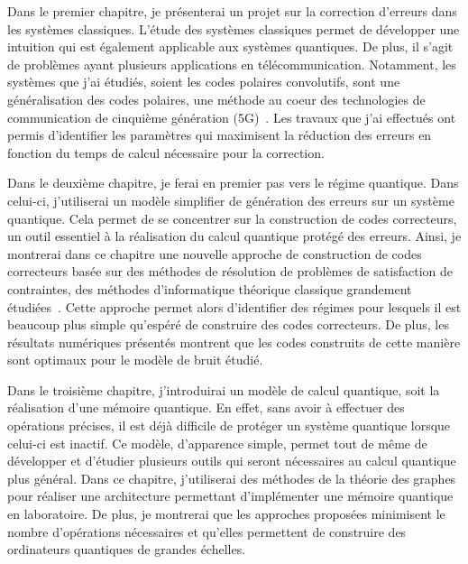 Dans le premier chapitre,
je présenterai un projet sur la correction d'erreurs dans les systèmes classiques.
L'étude des systèmes classiques permet de développer une intuition qui est également
applicable aux systèmes quantiques.
De plus, il s'agit de problèmes ayant plusieurs applications en télécommunication.
Notamment,
les systèmes que j'ai étudiés,
soient les codes polaires convolutifs,
sont une généralisation des codes polaires,
une méthode au coeur des technologies de communication de cinquième génération (5G)~\cite{arikan_rate_2009, bioglio_design_2021}.
Les travaux que j'ai effectués ont permis d'identifier les paramètres qui maximisent la réduction des erreurs
en fonction du temps de calcul nécessaire pour la correction.

Dans le deuxième chapitre,
je ferai en premier pas vers le régime quantique.
Dans celui-ci,
j'utiliserai un modèle simplifier de génération des erreurs sur un système quantique.
Cela permet de se concentrer sur la construction de codes correcteurs,
un outil essentiel à la réalisation du calcul quantique protégé des erreurs.
Ainsi,
je montrerai dans ce chapitre une nouvelle approche de construction de codes correcteurs
basée sur des méthodes de résolution de problèmes de satisfaction de contraintes,
des méthodes d'informatique théorique classique grandement étudiées~\cite{arora_computational_2009, noauthor_minizinc_nodate, noauthor_sat_nodate, achlioptas_rigorous_2005}.
Cette approche permet alors d'identifier des régimes pour lesquels il est beaucoup plus simple qu'espéré
de construire des codes correcteurs.
De plus,
les résultats numériques présentés montrent que les codes construits de cette manière
sont optimaux pour le modèle de bruit étudié.

Dans le troisième chapitre,
j'introduirai un modèle de calcul quantique,
soit la réalisation d'une mémoire quantique.
En effet,
sans avoir à effectuer des opérations précises,
il est déjà difficile de protéger un système quantique lorsque celui-ci est inactif.
Ce modèle,
d'apparence simple,
permet tout de même de développer et d'étudier plusieurs outils qui seront nécessaires
au calcul quantique plus général.
Dans ce chapitre,
j'utiliserai des méthodes de la théorie des graphes pour réaliser une architecture 
permettant d'implémenter une mémoire quantique en laboratoire.
De plus,
je montrerai que les approches proposées minimisent le nombre d'opérations nécessaires
et qu'elles permettent de construire des ordinateurs quantiques de grandes échelles.
\begin{comment}
\end{comment}

